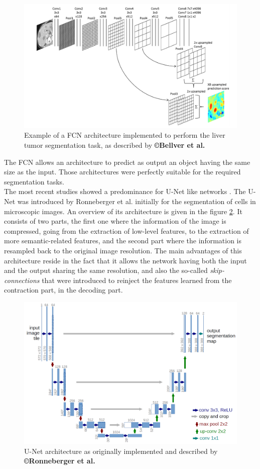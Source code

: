 \begin{figure}[th!]
	\centering
	\includegraphics[width=0.7\linewidth]{images/image3}
	\caption{Example of a FCN architecture implemented to perform the liver tumor segmentation task, as described by \textbf{©Bellver et al. \cite{Bellver2017}}}
	\label{Bellver_FCN}
\end{figure}


The FCN allows an architecture to predict as output an object having the
same size as the input. Those architectures were perfectly suitable for
the required segmentation tasks.\\
The most recent studies showed a predominance for U-Net like networks \cite{Vorontsov2018, Yuan2017}. The U-Net was
introduced by Ronneberger et al. \cite{Ronneberger2015} initially for the segmentation of cells
in microscopic images. An overview of its architecture is given in the
figure \ref{U_Net_Figure}. It consists of two parts, the first one where the
information of the image is compressed, going from the extraction of
low-level features, to the extraction of more semantic-related features,
and the second part where the information is resampled back to the
original image resolution. The main advantages of this architecture
reside in the fact that it allows the network having both the input and
the output sharing the same resolution, and also the so-called
\emph{skip-connections} that were introduced to reinject the features
learned from the contraction part, in the decoding part.

\begin{figure}[th!]
	\centering
	\includegraphics[width=0.7\linewidth]{images/u-net-architecture}
	\caption{U-Net architecture as originally implemented and described by \textbf{©Ronneberger et al.\cite{Ronneberger2015}}}
	\label{U_Net_Figure}
\end{figure}

